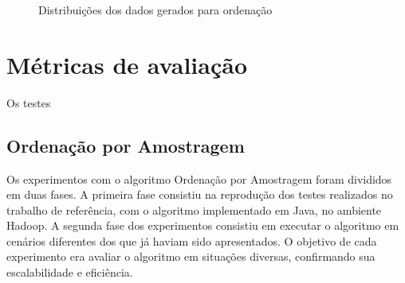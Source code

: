 \begin{figure}[!h]

\centering
{}
\caption{Distribuições dos dados gerados para ordenação}

\end{figure}


\section{Métricas de avaliação}

Os testes 


\subsection{Ordenação por Amostragem}

Os experimentos com o algoritmo Ordenação por Amostragem foram divididos em duas fases. A primeira fase consistiu na reprodução dos testes realizados no trabalho de referência, com o algoritmo implementado em Java, no ambiente Hadoop. A segunda fase dos experimentos consistiu em executar o algoritmo em cenários diferentes dos que já haviam sido apresentados. O objetivo de cada experimento era avaliar o algoritmo em situações diversas, confirmando sua escalabilidade e eficiência.

